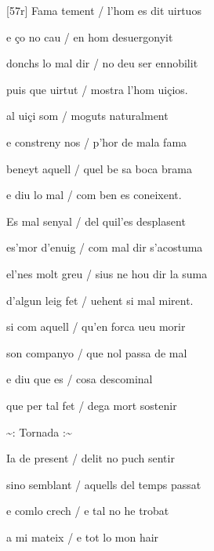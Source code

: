 \documentclass[12pt]{article}
\begin{document}
\begin{estrofa}

 [57r] Fama tement / l'hom es dit uirtuos

 e \c{c}o no cau / en hom desuergonyit

 donchs lo mal dir / no deu ser ennobilit

 puis que uirtut / mostra l'hom ui\c{c}ios.

 al ui\c{c}i som / moguts naturalment

 e constreny nos / p'hor de mala fama

 beneyt aquell / quel be sa boca brama

 e diu lo mal / com ben es coneixent.

\end{estrofa}



\begin{estrofa}

 Es mal senyal / del quil'es desplasent

 es'mor d'enuig / com mal dir s'acostuma

 el'nes molt greu / sius ne hou dir la suma

 d'algun leig fet / uehent si mal mirent.

 si com aquell / qu'en forca ueu morir

 son companyo / que nol passa de mal

 e diu que es / cosa descominal

 que per tal fet / dega mort sostenir

\end{estrofa}


\begin{estrofaExtra}%




\begin{tornada}

\textasciitilde{}: Tornada
:\textasciitilde{}

\end{tornada}


\end{estrofaExtra}


\begin{estrofa}

 Ia de present / delit no puch sentir

 sino semblant / aquells del temps passat

 e comlo crech / e tal no he trobat

 a mi mateix / e tot lo mon hair

\end{estrofa}
\end{document}
